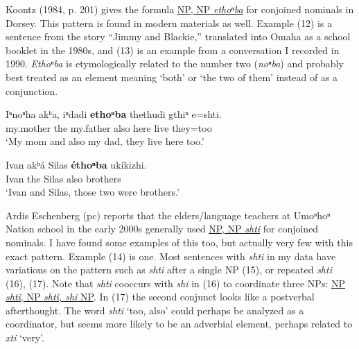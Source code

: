 \documentclass[output=paper]{LSP/langsci}
\begin{document}
Koontz (1984, p. 201) gives the formula \underline{NP, NP \textit{ethoⁿba}} for conjoined nominals in Dorsey.  This pattern is found in modern materials as well.  Example (12) is a sentence from the story ``Jimmy and Blackie,'' translated into Omaha as a school booklet in the 1980s, and (13) is an example from a conversation I recorded in 1990. \textit{Ethoⁿba} is etymologically related to the number two (\textit{noⁿba}) and probably best treated as an element meaning `both' or `the two of them' instead of as a conjunction.

\begin{exe}
\ex 
\gll  Iⁿnoⁿha  	akʰa, iⁿdadi    \textbf{ethoⁿba} 	thethudi 	gthiⁿ 	e=shti.  \\
	my.mother 	the  	my.father 	also        	here       	live   	they=too\\
\trans `My mom and also my dad, they live here too.'

\ex 
\gll  Ivan 	akʰ\'a Silas 	\textbf{\'ethoⁿba} uk\'ikizhi. \\         
Ivan the   Silas	 also       	brothers\\
\trans`Ivan and Silas, those two were brothers.'
\end{exe}

Ardis Eschenberg (pc) reports that the elders/language teachers at Umoⁿhoⁿ Nation school in the early 2000s generally used \underline{NP, NP \textit{shti}} for conjoined nominals.  I have found some examples of this too, but actually very few with this exact pattern.  Example (14) is one.  Most sentences with \textit{shti} in my data have variations on the pattern such as \textit{shti} after a single NP (15), or repeated \textit{shti} (16), (17).   Note that \textit{shti} cooccurs with \textit{shi} in (16) to coordinate three NPs:  \underline{NP \textit{shti}, NP \textit{shti, shi} NP}.  In (17) the second conjunct looks like a postverbal afterthought. The word \textit{shti} `too, also' could perhaps be analyzed as a coordinator, but seems more likely to be an adverbial element, perhaps related to \textit{xti} `very'.
\end{document}
